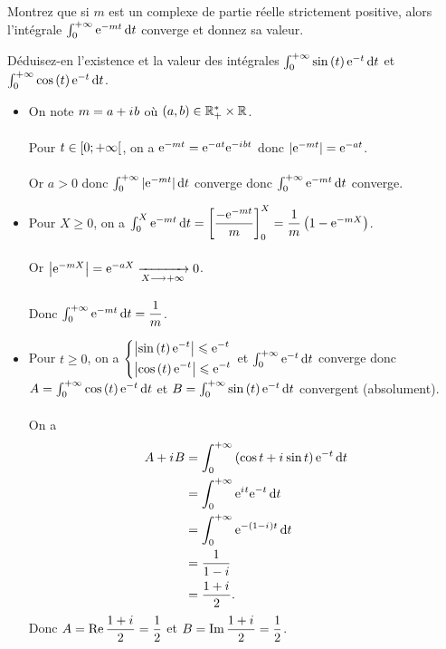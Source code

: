 \begin{exo}
Montrez que si \(m\) est un complexe de partie réelle strictement positive, alors l'intégrale \(\int_0^{\pinf}\e{-mt}\odif{t}\) converge et donnez sa valeur.

Déduisez-en l'existence et la valeur des intégrales \(\int_0^{\pinf}\sin\paren{t}\e{-t}\odif{t}\) et \(\int_0^{\pinf}\cos\paren{t}\e{-t}\odif{t}\).
\end{exo}

\begin{corr}
\begin{itemize}
    \item On note \(m=a+i\mkern1mu b\) où \(\left(a,b\right)\in\mathbb{R}_+^*\times\mathbb{R}\). \\\\ Pour \(t\in\left[0;+\infty\right[\), on a \(\mathrm{e}^{-mt}=\mathrm{e}^{-at}\mathrm{e}^{-i\mkern1mu bt}\) donc \(\left\lvert\mathrm{e}^{-mt}\right\rvert=\mathrm{e}^{-at}\). \\\\ Or \(a>0\) donc \(\int_0^{\pinf}\abs{\e{-mt}}\odif{t}\) converge donc \(\int_0^{\pinf}\e{-mt}\odif{t}\) converge. \\
    \item Pour \(X\geq0\), on a \(\int_0^X\e{-mt}\odif{t}=\croch{\dfrac{-\e{-mt}}{m}}_0^X=\dfrac{1}{m}\paren{1-\e{-mX}}\). \\\\ Or \(\left\lvert\mathrm{e}^{-mX}\right\rvert=\mathrm{e}^{-aX}\xrightarrow[X\longrightarrow+\infty]{}0\). \\\\ Donc \(\int_0^{\pinf}\e{-mt}\odif{t}=\dfrac{1}{m}\). \\
    \item Pour \(t\geq0\), on a \(\begin{dcases}
        \left\lvert\sin\left(t\right)\mathrm{e}^{-t}\right\rvert\leqslant\mathrm{e}^{-t} \\
        \left\lvert\cos\left(t\right)\mathrm{e}^{-t}\right\rvert\leqslant\mathrm{e}^{-t}
    \end{dcases}\) et \(\int_0^{\pinf}\e{-t}\odif{t}\) converge donc \(A=\int_0^{\pinf}\cos\paren{t}\e{-t}\odif{t}\) et \(B=\int_0^{\pinf}\sin\paren{t}\e{-t}\odif{t}\) convergent (absolument). \\\\ On a \[\begin{aligned}
        A+\i B&=\int_0^{\pinf}\paren{\cos t+\i\sin t}\e{-t}\odif{t} \\
        &=\int_0^{\pinf}\e{\i t}\e{-t}\odif{t} \\
        &=\int_0^{\pinf}\e{-\paren{1-\i}t}\odif{t} \\
        &=\dfrac{1}{1-i} \\
        &=\dfrac{1+\i}{2}.
    \end{aligned}\] Donc \(A=\operatorname{Re}\dfrac{1+i\mkern1mu}{2}=\dfrac{1}{2}\) et \(B=\operatorname{Im}\dfrac{1+i\mkern1mu}{2}=\dfrac{1}{2}\).
\end{itemize}
\end{corr}

